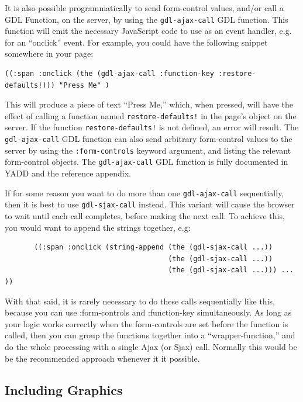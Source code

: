 \documentclass [11pt]{book}
\begin{document}
It is also possible programmatically to send form-control
      values, and/or call a GDL Function, on the server, by
      using the \texttt{gdl-ajax-call} GDL function. This function will emit the necessary
	  JavaScript code to use as an event handler, e.g. for an
	  ``onclick'' event. For example, you could have the following snippet somewhere in your page:

\begin{verbatim}((:span :onclick (the (gdl-ajax-call :function-key :restore-defaults!))) "Press Me" )
\end{verbatim}This will produce a piece of text ``Press Me,'' which,
	  when pressed, will have the effect of calling a function named \texttt{restore-defaults!} in the page's object on the server. If the function \texttt{restore-defaults!} is not defined, an error will result. The \texttt{gdl-ajax-call} GDL function can also send arbitrary form-control values
	  to the server by using the \texttt{:form-controls} keyword argument, and listing the relevant form-control objects. The \texttt{gdl-ajax-call} GDL function is fully documented in YADD and the reference appendix.



If for some reason you want to do more than one \texttt{gdl-ajax-call} sequentially, then it is best to use \texttt{gdl-sjax-call} instead. This variant will cause the browser to wait until
	  each call completes, before making the next call. To achieve
	  this, you would want to append the strings together, e.g:

\begin{verbatim}
       ((:span :onclick (string-append (the (gdl-sjax-call ...))  
                                       (the (gdl-sjax-call ...)) 
                                       (the (gdl-sjax-call ...))) ... ))
\end{verbatim}With that said, it is rarely necessary to do these calls
	  sequentially like this, because you can use :form-controls
	  and :function-key simultaneously. As long as your logic
	  works correctly when the form-controls are set before the
	  function is called, then you can group the functions
	  together into a ``wrapper-function,'' and do the whole
	  processing with a single Ajax (or Sjax) call. Normally this
	  would be be the recommended approach whenever it it
	  possible.



\subsection{Including Graphics}
\end{document}
